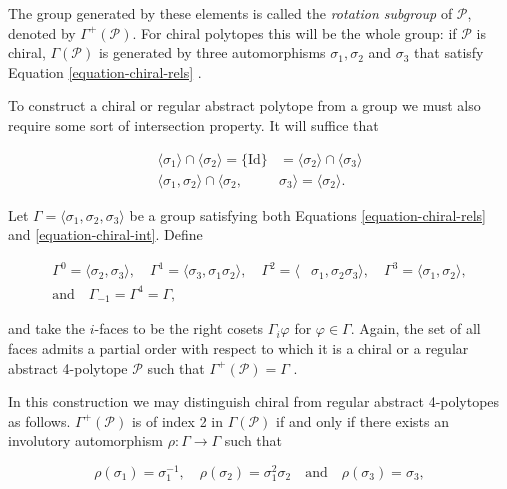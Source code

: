 \documentclass{amsart}
\begin{document}
The group generated by these elements is called the \textit{rotation subgroup}
of $\mathcal{P}$, denoted by $\Gamma^+(\mathcal{P})$. For chiral polytopes this
will be the whole group: if $\mathcal{P}$ is chiral, $\Gamma(\mathcal{P})$ is
generated by three automorphisms $\sigma_1,\sigma_2$ and $\sigma_3$ that satisfy
Equation \ref{equation-chiral-rels} \cite[Proposition 3]{egon-asia-chiral}.
	
To construct a chiral or regular abstract polytope from a group we must
also require some sort of intersection property. It will suffice that

\begin{equation}
\label{equation-chiral-int}
\begin{aligned}
\langle\sigma_1\rangle\cap\langle\sigma_2\rangle=\{\text{Id}\}
&=\langle\sigma_2\rangle\cap\langle\sigma_3\rangle\\
\langle\sigma_1,\sigma_2\rangle\cap\langle\sigma_2,&\sigma_3\rangle
=\langle\sigma_2\rangle.
\end{aligned}
\end{equation}

Let $\Gamma=\langle \sigma_1,\sigma_2,\sigma_3\rangle$ be a group satisfying
both Equations \ref{equation-chiral-rels} and \ref{equation-chiral-int}. Define

\begin{align*}
\Gamma^0=\langle\sigma_2,\sigma_3\rangle,\quad
\Gamma^1=\langle \sigma_3,\sigma_1\sigma_2\rangle,\quad
\Gamma^2=\langle &\sigma_1,\sigma_2\sigma_3\rangle,\quad
\Gamma^3=\langle \sigma_1,\sigma_2\rangle,\\
\text{and}\quad\Gamma_{-1}=\Gamma^4=\Gamma,
\end{align*}

and take the $i$-faces to be the right cosets $\Gamma_i\varphi$ for
$\varphi\in\Gamma$. Again, the set of all faces admits a partial order with
respect to which it is a chiral or a regular abstract 4-polytope $\mathcal{P}$
such that $\Gamma^+(\mathcal{P})=\Gamma$ \cite[Theorem 1, Lemma
11]{egon-asia-chiral}.
	
In this construction we may distinguish chiral from regular abstract 4-polytopes
as follows. $\Gamma^+(\mathcal{P})$ is of index 2 in $\Gamma(\mathcal{P})$ if
and only if there exists an involutory automorphism $\rho:\Gamma\to \Gamma$ such
that

\begin{equation}
\label{equation-combinatorially-chiral}
\rho(\sigma_1)=\sigma_1^{-1},\quad \rho(\sigma_2)
=\sigma_1^2\sigma_2\quad\text{and}\quad \rho(\sigma_3)
=\sigma_3,
\end{equation}
\end{document}
